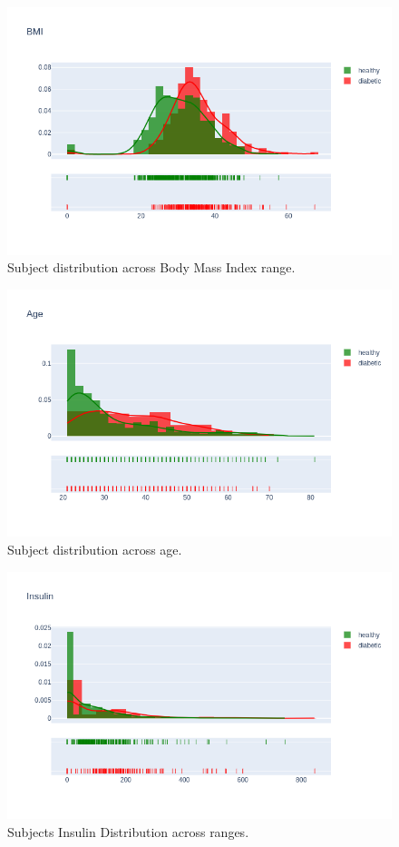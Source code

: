 \documentclass[12pt]{article}
\begin{document}
\begin{figure}[ht]
\centering
\includegraphics[width=1\textwidth]{10.png}
\caption{\label{fig:1} Subject distribution across Body Mass Index range.}
\end{figure}

\begin{figure}[ht]
\centering
\includegraphics[width=1\textwidth]{11.png}
\caption{\label{fig:2} Subject distribution across age.}
\end{figure}

\begin{figure}[ht]
\centering
\includegraphics[width=1\textwidth]{14.png}
\caption{\label{fig:5} Subjects Insulin Distribution across ranges.}
\end{figure}
\end{document}
